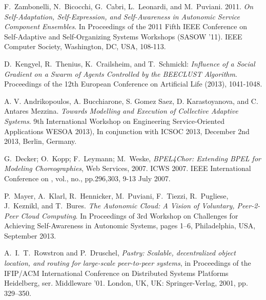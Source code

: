\documentclass{llncs}
\begin{document}
\begin{thebibliography}{1}
F.~Zambonelli, N.~Bicocchi, G.~Cabri, L.~Leonardi, and M.~Puviani. 2011. \emph{On Self-Adaptation, Self-Expression, and Self-Awareness in Autonomic Service Component Ensembles}. In Proceedings of the 2011 Fifth IEEE Conference on Self-Adaptive and Self-Organizing Systems Workshops (SASOW '11). IEEE Computer Society, Washington, DC, USA, 108-113.

D.~Kengyel, R.~Thenius, K.~Crailsheim, and T.~Schmickl: \emph{Influence of a Social Gradient on a Swarm of Agents Controlled by the BEECLUST Algorithm}. Proceedings of the 12th European Conference on Artificial Life (2013), 1041-1048.

A. V. Andrikopoulos, A. Bucchiarone, S. Gomez Saez, D. Karastoyanova, and C. Antares Mezzina. \emph{Towards Modelling and Execution of Collective Adaptive Systems}. 9th International Workshop on Engineering Service-Oriented Applications WESOA 2013), In conjunction with ICSOC 2013, December 2nd 2013, Berlin, Germany.

G.~Decker; O.~Kopp; F.~Leymann; M.~Weske, \emph{BPEL4Chor: Extending BPEL for Modeling Choreographies}, Web Services, 2007. ICWS 2007. IEEE International Conference on , vol., no., pp.296,303, 9-13 July 2007.





P.~Mayer, A.~Klarl, R.~Hennicker, M.~Puviani, F.~Tiezzi, R.~Pugliese, J.~Keznikl, and T.~Bures. \emph{The Autonomic Cloud: A Vision of Voluntary, Peer-2-Peer Cloud Computing}. In Proceedings of 3rd Workshop on Challenges for Achieving Self-Awareness in Autonomic Systems, pages 1–6, Philadelphia, USA, September 2013.

A.~I.~T.~Rowstron and P.~Druschel, \emph{Pastry: Scalable, decentralized object location, and routing for large-scale peer-to-peer systems}, in Proceedings of the IFIP/ACM International Conference on Distributed Systems Platforms Heidelberg, ser. Middleware ’01. London, UK, UK: Springer-Verlag, 2001, pp. 329–350.


\end{thebibliography}
\end{document}
